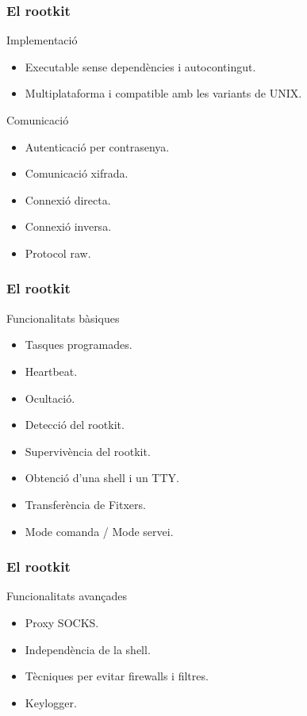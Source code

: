 \documentclass{beamer}
\begin{document}
\begin{frame}
	\frametitle{El rootkit}
	\begin{block}{Implementació}
		\begin{itemize}
			\item Executable sense dependències i autocontingut.
			\item Multiplataforma i compatible amb les variants de UNIX.
		\end{itemize}
	\end{block}
	\begin{block}{Comunicació}
		\begin{itemize}
			\item Autenticació per contrasenya.
			\item Comunicació xifrada.
			\item Connexió directa.
			\item Connexió inversa.
			\item Protocol raw.
		\end{itemize}
	\end{block}
\end{frame}
\begin{frame}
	\frametitle{El rootkit}
	\begin{block}{Funcionalitats bàsiques}
		\begin{itemize}
			\item Tasques programades.
			\item Heartbeat.
			\item Ocultació.
			\item Detecció del rootkit.
			\item Supervivència del rootkit.
			\item Obtenció d'una shell i un TTY.
			\item Transferència de Fitxers.
			\item Mode comanda / Mode servei.
		\end{itemize}
	\end{block}
\end{frame}
\begin{frame}
	\frametitle{El rootkit}
	\begin{block}{Funcionalitats avançades}
		\begin{itemize}
			\item Proxy SOCKS.
			\item Independència de la shell.
			\item Tècniques per evitar firewalls i filtres.
			\item Keylogger.
		\end{itemize}
	\end{block}
\end{frame}
\end{document}
